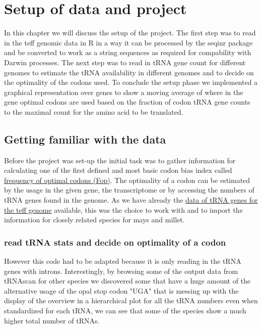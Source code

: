 \chapter{Setup of data and project}
In this chapter we will discuss the setup of the project. The first step was to read in the teff genomic data in R in a way it can be processed by the seqinr package and be converted to work as a string sequences as required for compability with Darwin processes. The next step was to read in tRNA gene count for different genomes to estimate the tRNA availability in different genomes and to decide on the optimality of the codons used. To conclude the setup phase we implemented a graphical representation over genes to show a moving average of where in the gene optimal codons are used based on the fraction of codon tRNA gene counts to the maximal count for the amino acid to be translated. 

\section{Getting familiar with the data}
Before the project was set-up the initial task was to gather information for calculating one of the first defined and most basic codon bias index called \hyperlink{function:Fop}{frequency of optimal codons (Fop)}. The optimality of a codon can be estimated by the usage in the given gene, the transcriptome or by accessing the numbers of tRNA genes found in the genome. As we have already the \hyperlink{data:tRNAlist}{data of tRNA genes for the teff genome} available, this was the choice to work with and to import the information for closely related species for mays and millet.

\subsection{read tRNA stats and decide on optimality of a codon}
  
      
 
However this code had to be adapted because it is only reading in the tRNA genes with introns. Interestingly, by browsing some of the output data from tRNAscan for other species we discovered some that have a huge amount of the alternative usage of the opal stop codon "UGA" that is messing up with the display of the overview in a hierarchical plot for all the tRNA numbers even when standardized for each tRNA, we can see that some of the species show a much higher total number of tRNAs. 


